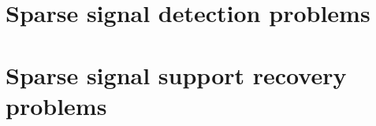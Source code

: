 \section{Sparse signal detection problems}
\label{sec:global-tests}



\section{Sparse signal support recovery problems}
\label{sec:additive-error-model-boundaries}



%




